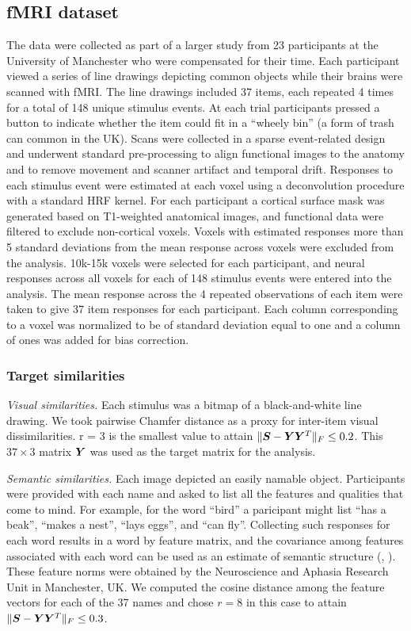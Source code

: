 \subsection{fMRI dataset} The data were collected as part of a larger study from 23
participants at the University of Manchester who were compensated for their time. Each
participant viewed a series of line drawings depicting common objects while their brains
were scanned with fMRI. The line drawings included 37 items, each repeated 4 times for a
total of 148 unique stimulus events. At each trial participants pressed a button to
indicate whether the item could fit in a ``wheely bin'' (a form of trash can common in the
UK).
Scans were collected in a sparse event-related design and underwent standard
pre-processing to align functional images to the anatomy and to remove movement and
scanner artifact and temporal drift. Responses to each stimulus event were estimated at
each voxel using a deconvolution procedure with a standard HRF kernel. For each
participant a cortical surface mask was generated based on T1-weighted anatomical images,
and functional data were filtered to exclude non-cortical voxels. Voxels with estimated
responses more than 5 standard deviations from the mean response across voxels were
excluded from the analysis. 10k-15k voxels were selected for each participant, and neural
responses across all voxels for each of 148 stimulus events were entered into the
analysis. The mean response across the 4 repeated observations of each item were taken to
give 37 item responses for each participant. Each column corresponding to a voxel was
normalized to be of standard deviation equal to one and a column of ones was added for
bias correction.

\subsubsection*{Target similarities}
\textit{Visual similarities.} Each stimulus was a bitmap of a black-and-white line
drawing. We took pairwise Chamfer distance as a proxy for inter-item visual
dissimilarities. r = 3 is the smallest value to attain $\|\boldsymbol{S} - \boldsymbol{Y}\boldsymbol{Y}^T\|_F \leq 0.2$.
This $37 \times 3$ matrix $\boldsymbol{Y}$ was used as the target matrix for the analysis.

\textit{Semantic similarities.} Each image depicted an easily namable object. Participants
were provided with each name and asked to list all the features and qualities that come to
mind. For example, for the word ``bird'' a paricipant might list ``has a beak'', ``makes a
nest'', ``lays eggs'', and ``can fly''. Collecting such responses for each word results in
a word by feature matrix, and the covariance among features associated with each word can
be used as an estimate of semantic structure (\eg, \cite{mcrae2005semantic}). These feature norms were obtained by the Neuroscience and Aphasia Research Unit in
Manchester, UK. We computed the cosine distance among the feature vectors for each of the 37 names
and chose $r = 8$ in this case to attain $\|\boldsymbol{S} - \boldsymbol{Y}\boldsymbol{Y}^T\|_F \leq 0.3$.

